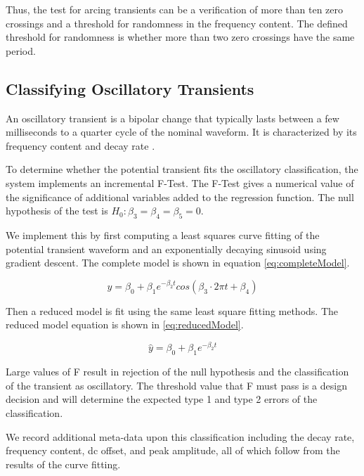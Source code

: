 \documentclass[10pt, conference, compsocconf]{IEEEtran}
\begin{document}
Thus, the test for arcing transients can  be a verification of more than ten zero crossings and a threshold for randomness in the frequency content. The defined threshold for randomness is whether more than two zero crossings have the same period.

\subsection{Classifying Oscillatory Transients}

An oscillatory transient is a bipolar change that typically lasts between a few milliseconds to a quarter cycle of the nominal waveform. It is characterized by its frequency content and decay rate \cite{IEEE:2018:1159D3}.

To determine whether the potential transient fits the oscillatory classification, the system implements an incremental F-Test. The F-Test gives a numerical value of the significance of additional variables added to the regression function. The null hypothesis of the test is  $H_0: \beta_3 = \beta_4 = \beta_5 = 0$.

We implement this by first computing a least squares curve fitting of the potential transient waveform and an exponentially decaying sinusoid using gradient descent. The complete model is shown in equation \ref{eq:completeModel}.

\begin{equation}
\label{eq:completeModel}
\hat{y} = \beta_0 + \beta_1 e^{-\beta_2 t} cos(\beta_3 \cdot 2 \pi t + \beta_4)
\end{equation}

Then a reduced model is fit using the same least square fitting methods. The reduced model equation is shown in \ref{eq:reducedModel}.

\begin{equation}
\label{eq:reducedModel}
\hat{y} = \beta_0 + \beta_1 e^{-\beta_2 t}
\end{equation}

Large values of F result in rejection of the null hypothesis and the classification of the transient as oscillatory. The threshold value that F must pass is a design decision and will determine the expected type 1 and type 2 errors of the classification.

We record additional meta-data upon this classification including the decay rate, frequency content, dc offset, and peak amplitude, all of which follow from the results of the curve fitting.
\end{document}
